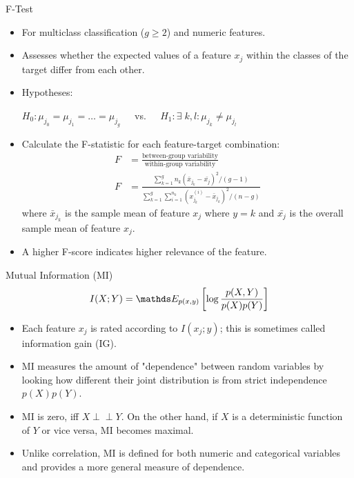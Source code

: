 \documentclass[11pt,compress,t,notes=noshow, xcolor=table]{beamer}
\begin{document}
  \begin{vbframe}{F-Test}
  \begin{itemize}
    \item For multiclass classification ($g \ge 2$) and numeric features.
    \item Assesses whether the expected values of a feature $x_j$ within the classes of the target differ from each other.
    \item Hypotheses:

    $H_0: \mu_{j_0} = \mu_{j_1} = \dots = \mu_{j_g} \;\;\;\;$ vs. $\;\;\;\;H_1 : \exists \; k,l: \mu_{j_k} \neq \mu_{j_l}$
    \item Calculate the F-statistic for each feature-target combination:
    \begin{align*}
    F &= \frac{\text{between-group variability}}{\text{within-group variability}}\\
    F &= \frac{\sum_{k = 1}^g n_k (\bar{x}_{j_k} - \bar{x_j})^2/(g-1)}{\sum_{k = 1}^g \sum_{i = 1}^{n_k} (x_{j_k}^{(i)} - \bar{x}_{j_k})^2/(n-g)}
    \end{align*}
    where $\bar{x}_{j_k}$ is the sample mean of feature $x_j$ where $y = k$ and $\bar{x_{j}}$ is the overall sample mean of feature $x_j$.
  \item A higher F-score indicates higher relevance of the feature.
  \end{itemize}
  \end{vbframe}

  \begin{vbframe}{Mutual Information (MI)}
  $$I(X ; Y) = \E_{p(x, y)} \left[ \log \frac{p(X, Y)}{p(X) p(Y)} \right]$$

  \begin{itemize}
  \setlength{\itemsep}{1.2em}
    \item Each feature $x_j$ is rated according to $I(x_j;y)$; this is sometimes called information gain (IG).
    \item MI measures the amount of "dependence" between random variables by looking how
    different their joint distribution is from strict independence $p(X)p(Y)$.
    \item MI is zero, iff $X \perp \!\!\! \perp Y$. On the other hand, if $X$ is a deterministic function of $Y$ or vice versa, MI becomes maximal.
  \item Unlike correlation, MI is defined for both numeric and categorical variables and provides a more general measure of dependence.
  \end{itemize}
  \end{vbframe}

  \endlecture
\end{document}

